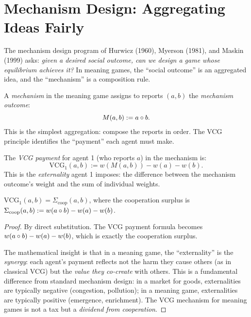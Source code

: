 \section{Mechanism Design: Aggregating Ideas Fairly}

The mechanism design program of Hurwicz (1960), Myerson (1981), and
Maskin (1999) asks: \emph{given a desired social outcome, can we design
a game whose equilibrium achieves it?} In meaning games, the ``social
outcome'' is an aggregated idea, and the ``mechanism'' is a composition
rule.

\begin{definition}
\label{def:mechanism-outcome}
A \emph{mechanism} in the meaning game assigns to reports $(a, b)$ the
\emph{mechanism outcome}:
\[
M(a, b) := a \circ b.
\]
This is the simplest aggregation: compose the reports in order. The VCG
principle identifies the ``payment'' each agent must make.
\end{definition}

\begin{definition}
\label{def:vcg-payment}
The \emph{VCG payment} for agent 1 (who reports $a$) in the mechanism is:
\[
\text{VCG}_1(a, b) := w(M(a, b)) - w(a) - w(b).
\]
This is the \emph{externality} agent 1 imposes: the difference between the
mechanism outcome's weight and the sum of individual weights.
\end{definition}

\begin{theorem}
\label{thm:vcg-coop}
$\text{VCG}_1(a, b) = \Sigma_{\text{coop}}(a, b)$, where the cooperation
surplus is $\Sigma_{\text{coop}}(a, b) := w(a \circ b) - w(a) - w(b)$.
\end{theorem}

\begin{proof}
By direct substitution. The VCG payment formula becomes
$w(a \circ b) - w(a) - w(b)$, which is exactly the cooperation surplus.

The mathematical insight is that in a meaning game, the ``externality''
is the \emph{synergy}: each agent's payment reflects not the harm they
cause others (as in classical VCG) but the \emph{value they co-create}
with others. This is a fundamental difference from standard mechanism
design: in a market for goods, externalities are typically negative
(congestion, pollution); in a meaning game, externalities are typically
positive (emergence, enrichment). The VCG mechanism for meaning games is
not a tax but a \emph{dividend from cooperation}.
\end{proof}

